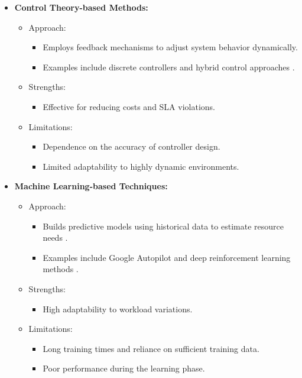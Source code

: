 \documentclass[conference]{IEEEtran}
\begin{document}
\begin{itemize}
    \item \textbf{Control Theory-based Methods:}
    \begin{itemize}
        \item Approach:
        \begin{itemize}
            \item Employs feedback mechanisms to adjust system behavior dynamically.
            \item Examples include discrete controllers \cite{baresi2016controller} and hybrid control approaches \cite{farokhi2016vertical}.
        \end{itemize}
        \item Strengths:
        \begin{itemize}
            \item Effective for reducing costs and SLA violations.
        \end{itemize}
        \item Limitations:
        \begin{itemize}
            \item Dependence on the accuracy of controller design.
            \item Limited adaptability to highly dynamic environments.
        \end{itemize}
    \end{itemize}
    
    \item \textbf{Machine Learning-based Techniques:}
    \begin{itemize}
        \item Approach:
        \begin{itemize}
            \item Builds predictive models using historical data to estimate resource needs \cite{rossi2019horizontal, rzadka2020autopilot}.
            \item Examples include Google Autopilot and deep reinforcement learning methods \cite{lee2020deep}.
        \end{itemize}
        \item Strengths:
        \begin{itemize}
            \item High adaptability to workload variations.
        \end{itemize}
        \item Limitations:
        \begin{itemize}
            \item Long training times and reliance on sufficient training data.
            \item Poor performance during the learning phase.
        \end{itemize}
    \end{itemize}
    

\end{itemize}
\end{document}
